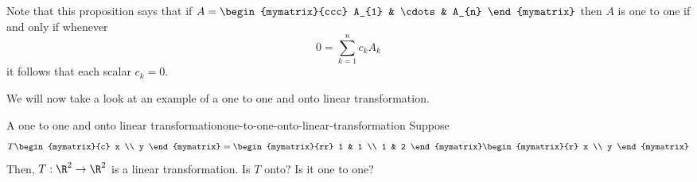 Note that this proposition says that if $A=\begin{mymatrix}{ccc}
A_{1} & \cdots & A_{n}
\end{mymatrix} $ then $A$ is one to one if and only if whenever
\begin{equation*}
0 = \sum_{k=1}^{n}c_{k}A_{k}
\end{equation*}
it follows that each scalar $c_{k}=0$.

We will now take a look at an example of a one to one and onto linear transformation.

\begin{example}{A one to one and onto linear transformation}{one-to-one-onto-linear-transformation}
Suppose
\begin{equation*}
T\begin{mymatrix}{c}
x \\
y
\end{mymatrix} =\begin{mymatrix}{rr}
1 & 1 \\
1 & 2
\end{mymatrix} \begin{mymatrix}{r}
x \\
y
\end{mymatrix}
\end{equation*}
Then, $T:\R^{2}\rightarrow \R^{2}$ is a linear
transformation. Is $T$ onto? Is it one to one?
\end{example}


